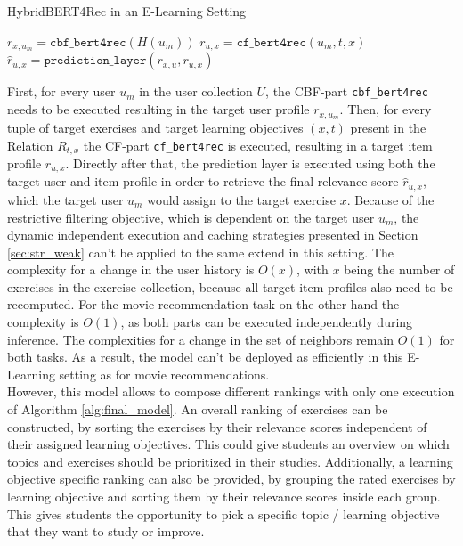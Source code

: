 \documentclass{Academic}
\begin{document}
        \begin{algorithm}[ht!]
            \caption{HybridBERT4Rec in an E-Learning Setting}
            \label{alg:final_model}
            \begin{algorithmic}[1]
                    \State $r_{x,u_m} = \texttt{cbf\_bert4rec}(H(u_m))$
                        \State $r_{u, x} = \texttt{cf\_bert4rec}(u_m,t,x)$
                        \State $\hat{r}_{u,x} = \texttt{prediction\_layer}(r_{x,u}, r_{u,x})$
                    \EndFor
                \EndFor
            \end{algorithmic}
        \end{algorithm}
        First, for every user $u_m$ in the user collection $U$, the CBF-part \texttt{cbf\_bert4rec} needs to be executed resulting in the target user profile $r_{x,u_m}$. Then, for every tuple of target exercises and target learning objectives $(x,t)$ present in the Relation $R_{t,x}$ the CF-part \texttt{cf\_bert4rec} is executed, resulting in a target item profile $r_{u,x}$. Directly after that, the prediction layer is executed using both the target user and item profile in order to retrieve the final relevance score $\hat{r}_{u,x}$, which the target user $u_m$ would assign to the target exercise $x$. Because of the restrictive filtering objective, which is dependent on the target user $u_m$, the dynamic independent execution and caching strategies presented in Section \ref{sec:str_weak} can't be applied to the same extend in this setting. The complexity for a change in the user history is $O(x)$, with $x$ being the number of exercises in the exercise collection, because all target item profiles also need to be recomputed. For the movie recommendation task on the other hand the complexity is $O(1)$, as both parts can be executed independently during inference. The complexities for a change in the set of neighbors remain $O(1)$ for both tasks. As a result, the model can't be deployed as efficiently in this E-Learning setting as for movie recommendations.\\
        However, this model allows to compose different rankings with only one execution of Algorithm \ref{alg:final_model}. An overall ranking of exercises can be constructed, by sorting the exercises by their relevance scores independent of their assigned learning objectives. This could give students an overview on which topics and exercises should be prioritized in their studies. Additionally, a learning objective specific ranking can also be provided, by grouping the rated exercises by learning objective and sorting them by their relevance scores inside each group. This gives students the opportunity to pick a specific topic / learning objective that they want to study or improve.
\end{document}
